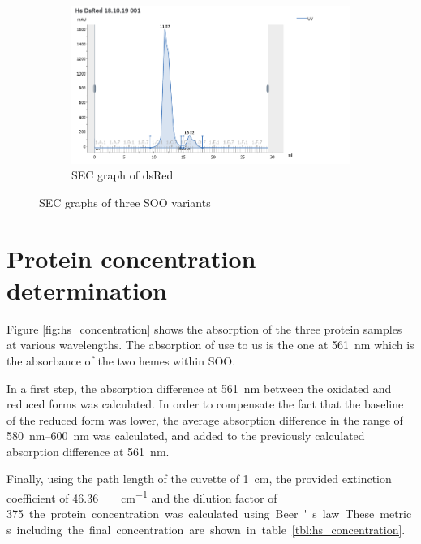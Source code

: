 \begin{figure}
    \begin{subfigure}{0.45\textwidth}
        \includegraphics[width=\textwidth]{img/sec_dsred}
        \caption{SEC graph of dsRed}
        \label{fig:sec_dsred}
    \end{subfigure}
    \caption{SEC graphs of three SOO variants}
    \label{fig:sec}
\end{figure}

\section{Protein concentration determination}

Figure \ref{fig:hs_concentration} shows the absorption of the three protein
samples at various wavelengths. The absorption of use to us is the one at
\SI{561}{\nm} which is the absorbance of the two hemes within SOO.

In a first step, the absorption difference at \SI{561}{\nm} between the
oxidated and reduced forms was calculated. In order to compensate the fact that
the baseline of the reduced form was lower, the average absorption difference
in the range of \SIrange{580}{600}{\nm} was calculated, and added to the
previously calculated absorption difference at \SI{561}{\nm}.

Finally, using the path length of the cuvette of \SI{1}{\cm}, the provided
extinction coefficient of \SI{46.36}{\per\milli\Molar\per\cm} and the dilution
factor of \SI{375} the protein concentration was calculated using Beer's law.
These metrics including the final concentration are shown in table
\ref{tbl:hs_concentration}.


